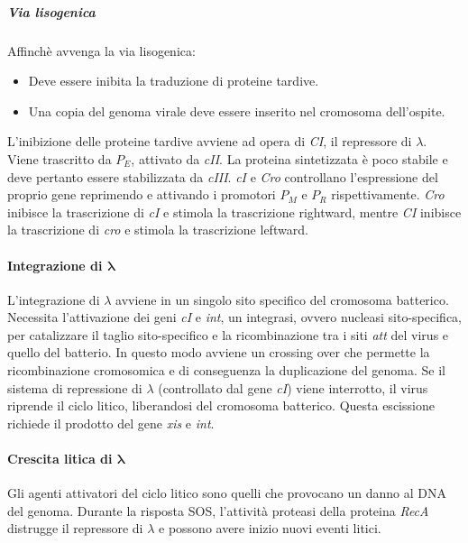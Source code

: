 				\subparagraph{Via lisogenica}
				Affinch\`e avvenga la via lisogenica:
				\begin{multicols}{2}
					\begin{itemize}
						\item Deve essere inibita la traduzione di proteine tardive.
						\item Una copia del genoma virale deve essere inserito nel cromosoma dell'ospite.
					\end{itemize}
				\end{multicols}
				L'inibizione delle proteine tardive avviene ad opera di \emph{CI}, il repressore di $\lambda$.
				Viene trascritto da \emph{$P_E$}, attivato da \emph{cII}.
				La proteina sintetizzata \`e poco stabile e deve pertanto essere stabilizzata da \emph{cIII}.
				\emph{cI} e \emph{Cro} controllano l'espressione del proprio gene reprimendo e attivando i promotori \emph{$P_M$} e \emph{$P_R$} rispettivamente.
				\emph{Cro} inibisce la trascrizione di \emph{cI} e stimola la trascrizione rightward, mentre \emph{CI} inibisce la trascrizione di \emph{cro} e stimola la trascrizione leftward.
				
			\paragraph{Integrazione di $\mathbf{\lambda}$}
			L'integrazione di $\lambda$ avviene in un singolo sito specifico del cromosoma batterico. 
			Necessita l'attivazione dei geni \emph{cI} e \emph{int}, un integrasi, ovvero nucleasi sito-specifica, per catalizzare il taglio sito-specifico e la ricombinazione tra i siti \emph{att} del virus e quello del batterio. 
			In questo modo avviene un crossing over che permette la ricombinazione cromosomica e di conseguenza la duplicazione del genoma. 
			Se il sistema di repressione di $\lambda$ (controllato dal gene \emph{cI}) viene interrotto, il virus riprende il ciclo litico, liberandosi del cromosoma batterico. 
			Questa escissione richiede il prodotto del gene \emph{xis} e \emph{int}.

			\paragraph{Crescita litica di $\mathbf{\lambda}$}
			Gli agenti attivatori del ciclo litico sono quelli che provocano un danno al DNA del genoma.
			Durante la risposta SOS, l'attività proteasi della proteina \emph{RecA} distrugge il repressore di $\lambda$ e possono avere inizio nuovi eventi litici. 


